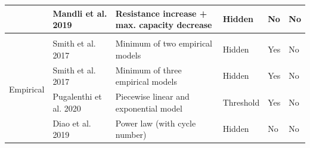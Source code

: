 \documentclass[journal=jpclcd,manuscript=article]{achemso}
\begin{document}
\begin{table}
{\begin{tabular}{|l|l|l|l|l|l|l|}
        \multicolumn{2}{|l|}{} & Mandli et al. 2019 \cite{mandli_analysis_2019} & Resistance increase + max. capacity decrease & Hidden & No & No \\ \hline
        \multicolumn{7}{c}{}  \\ \hline
        \multicolumn{2}{|l|}{\multirow{4}{*}{Empirical}} & Smith et al. 2017 \cite{smith_life_2017} & Minimum of two empirical models & Hidden & Yes & No \\ \cline{3-7} %
        \multicolumn{2}{|l|}{} & Smith et al. 2017 \cite{smith_life_2017} & Minimum of three empirical models & Hidden & Yes & No \\ \cline{3-7} %
        \multicolumn{2}{|l|}{} & Pugalenthi et al. 2020 \cite{pugalenthi_piecewise_2020} & Piecewise linear and exponential model & Threshold & Yes & No \\ \cline{3-7} %
        \multicolumn{2}{|l|}{} & Diao et al. 2019 \cite{diao_accelerated_2019} & Power law (with cycle number) & Hidden & No & No \\ \hline
    \end{tabular}
} %
\end{table}

\end{document}
